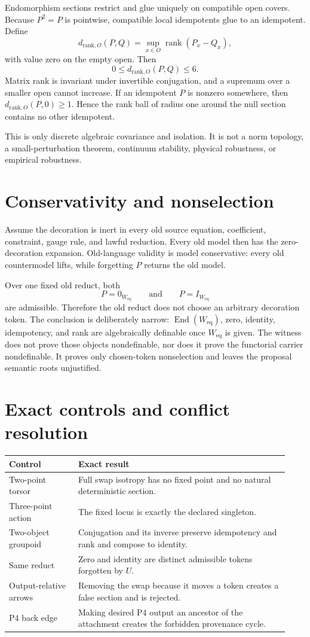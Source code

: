 \documentclass[11pt]{article}
\newcommand{\Weq}{W_{\mathrm{eq}}}
\begin{document}
Endomorphism sections restrict and glue uniquely on compatible open covers.
Because $P^2=P$ is pointwise, compatible local idempotents glue to an
idempotent. Define
\[
 d_{\mathrm{rank},O}(P,Q)
   =\sup_{x\in O}\operatorname{rank}(P_x-Q_x),
\]
with value zero on the empty open. Then
\[
 0\leq d_{\mathrm{rank},O}(P,Q)\leq6.
\]
Matrix rank is invariant under invertible conjugation, and a supremum over a
smaller open cannot increase. If an idempotent $P$ is nonzero somewhere, then
$d_{\mathrm{rank},O}(P,0)\geq1$. Hence the rank ball of radius one around the
null section contains no other idempotent.

This is only discrete algebraic covariance and isolation. It is not a norm
topology, a small-perturbation theorem, continuum stability, physical
robustness, or empirical robustness.

\section{Conservativity and nonselection}

Assume the decoration is inert in every old source equation, coefficient,
constraint, gauge rule, and lawful reduction. Every old model then has the
zero-decoration expansion. Old-language validity is model conservative:
every old countermodel lifts, while forgetting $P$ returns the old model.

Over one fixed old reduct, both
\[
 P=0_{\Weq}\qquad\text{and}\qquad P=I_{\Weq}
\]
are admissible. Therefore the old reduct does not choose an arbitrary
decoration token. The conclusion is deliberately narrow:
$\operatorname{End}(\Weq)$, zero, identity, idempotency, and rank are
algebraically definable once $\Weq$ is given. The witness does not prove those
objects nondefinable, nor does it prove the functorial carrier nondefinable. It
proves only chosen-token nonselection and leaves the proposal semantic roots
unjustified.

\section{Exact controls and conflict resolution}

\begin{longtable}{p{0.23\linewidth}p{0.70\linewidth}}
\toprule
Control & Exact result \\
\midrule
Two-point torsor & Full swap isotropy has no fixed point and no natural
deterministic section. \\
Three-point action & The fixed locus is exactly the declared singleton. \\
Two-object groupoid & Conjugation and its inverse preserve idempotency and
rank and compose to identity. \\
Same reduct & Zero and identity are distinct admissible tokens forgotten by
$U$. \\
Output-relative arrows & Removing the swap because it moves a token creates
a false section and is rejected. \\
P4 back edge & Making desired P4 output an ancestor of the attachment creates
the forbidden provenance cycle. \\
\bottomrule
\end{longtable}
\end{document}
